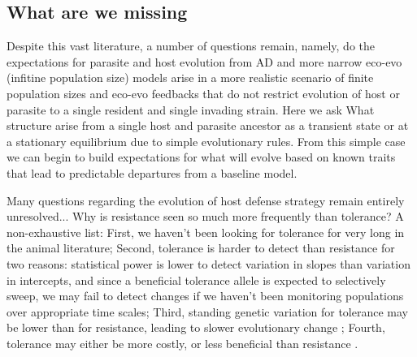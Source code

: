 \subsection*{What are we missing}

Despite this vast literature, a number of questions remain, namely, do the expectations for parasite and host evolution from AD and more narrow eco-evo (infitine population size) models arise in a more realistic scenario of finite population sizes and eco-evo feedbacks that do not restrict evolution of host or parasite to a single resident and single invading strain. Here we ask What structure arise from a single host and parasite ancestor as a transient state or at a stationary equilibrium due to simple evolutionary rules. From this simple case we can begin to build expectations for what will evolve based on known traits that lead to predictable departures from a baseline model.

Many questions regarding the evolution of host defense strategy remain entirely unresolved... Why is resistance seen so much more frequently than tolerance? A non-exhaustive list: First, we haven't been looking for tolerance for very long in the animal literature; Second, tolerance is harder to detect than resistance for two reasons: statistical power is lower to detect variation in slopes than variation in intercepts, and since a beneficial tolerance allele is expected to selectively sweep, we may fail to detect changes if we haven't been monitoring populations over appropriate time scales; Third, standing genetic variation for tolerance may be lower than for resistance, leading to slower evolutionary change ; Fourth, tolerance may either be more costly, or less beneficial than resistance .

